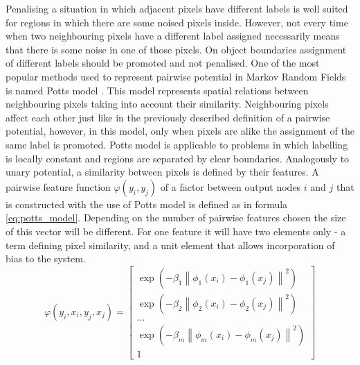 Penalising a situation in which adjacent pixels have different labels is well suited for regions in which there are some noised pixels inside. However, not every time when two neighbouring pixels have a different label assigned necessarily means that there is some noise in one of those pixels. On object boundaries assignment of different labels should be promoted and not penalised. One of the most popular methods used to represent pairwise potential in Markov Random Fields is named Potts model \cite{potts_model}. This model represents spatial relations between neighbouring pixels taking into account their similarity. Neighbouring pixels affect each other just like in the previously described definition of a pairwise potential, however, in this model, only when pixels are alike the assignment of the same label is promoted. Potts model is applicable to problems in which labelling is locally constant and regions are separated by clear boundaries. Analogously to unary potential, a similarity between pixels is defined by their features. A pairwise feature function $\varphi(y_i,y_j)$ of a factor between output nodes $i$ and $j$ that is constructed with the use of Potts model is defined as in formula \ref{eq:potts_model}. Depending on the number of pairwise features chosen the size of this vector will be different. For one feature it will have two elements only - a term defining pixel similarity, and a unit element that allows incorporation of bias to the system.
\begin{equation}
    \label{eq:potts_model}
    \varphi(y_i,x_i,y_j,x_j) = \begin{bmatrix}
        \exp{(-\beta_1 \left \| \phi_1(x_i) - \phi_1(x_j)\right \|^2)} \\
        \exp{(-\beta_2 \left \| \phi_2(x_i) - \phi_2(x_j)\right \|^2)} \\
        ...             \\
        \exp{(-\beta_m \left \| \phi_m(x_i) - \phi_m(x_j)\right \|^2)} \\
        1
    \end{bmatrix}
\end{equation}
